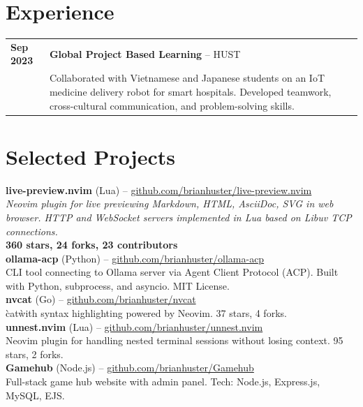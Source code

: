 \documentclass[a4paper,10pt]{article}
\begin{document}
\vspace{4mm}

\section{Experience}
\begin{tabular}{p{2.5cm}p{13cm}}
\textbf{Sep 2023} & \textbf{Global Project Based Learning} -- HUST\\
& Collaborated with Vietnamese and Japanese students on an IoT medicine delivery robot for smart hospitals. Developed teamwork, cross-cultural communication, and problem-solving skills.\\
\end{tabular}

\vspace{4mm}

\section{Selected Projects}
\vspace{2mm}

\textbf{live-preview.nvim} (Lua) -- \url{github.com/brianhuster/live-preview.nvim}\\
\textit{Neovim plugin for live previewing Markdown, HTML, AsciiDoc, SVG in web browser. HTTP and WebSocket servers implemented in Lua based on Libuv TCP connections.}\\
\textbf{360 stars, 24 forks, 23 contributors}\\[3mm]

\textbf{ollama-acp} (Python) -- \url{github.com/brianhuster/ollama-acp}\\
CLI tool connecting to Ollama server via Agent Client Protocol (ACP). Built with Python, subprocess, and asyncio. MIT License.\\[3mm]

\textbf{nvcat} (Go) -- \url{github.com/brianhuster/nvcat}\\
\`cat\` with syntax highlighting powered by Neovim. 37 stars, 4 forks.\\[3mm]

\textbf{unnest.nvim} (Lua) -- \url{github.com/brianhuster/unnest.nvim}\\
Neovim plugin for handling nested terminal sessions without losing context. 95 stars, 2 forks.\\[3mm]

\textbf{Gamehub} (Node.js) -- \url{github.com/brianhuster/Gamehub}\\
Full-stack game hub website with admin panel. Tech: Node.js, Express.js, MySQL, EJS.
\end{document}
